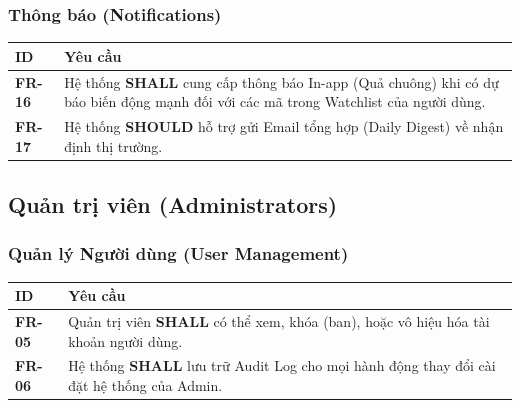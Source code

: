 \documentclass[12pt, a4paper]{article}
\begin{document}
\subsubsection{Thông báo (Notifications)}

\begin{table}[H]
    \centering
    \renewcommand{\arraystretch}{1.3}
    \begin{tabularx}{\textwidth}{|l|X|}
        \hline
        \rowcolor{gray!10}
        \textbf{ID}    & \textbf{Yêu cầu}                                                                                                                           \\
        \hline
        \textbf{FR-16} & Hệ thống \textbf{SHALL} cung cấp thông báo In-app (Quả chuông) khi có dự báo biến động mạnh đối với các mã trong Watchlist của người dùng. \\
        \hline
        \textbf{FR-17} & Hệ thống \textbf{SHOULD} hỗ trợ gửi Email tổng hợp (Daily Digest) về nhận định thị trường.                                                 \\
        \hline
    \end{tabularx}
\end{table}

\subsection{Quản trị viên (Administrators)}

\subsubsection{Quản lý Người dùng (User Management)}
\begin{table}[htbp]
    \centering
    \renewcommand{\arraystretch}{1.3}
    \begin{tabularx}{\textwidth}{|l|X|}
        \hline
        \rowcolor{gray!10}
        \textbf{ID}    & \textbf{Yêu cầu}                                                                                 \\
        \hline
        \textbf{FR-05} & Quản trị viên \textbf{SHALL} có thể xem, khóa (ban), hoặc vô hiệu hóa tài khoản người dùng.      \\
        \hline
        \textbf{FR-06} & Hệ thống \textbf{SHALL} lưu trữ Audit Log cho mọi hành động thay đổi cài đặt hệ thống của Admin. \\
        \hline
    \end{tabularx}
\end{table}
\end{document}
